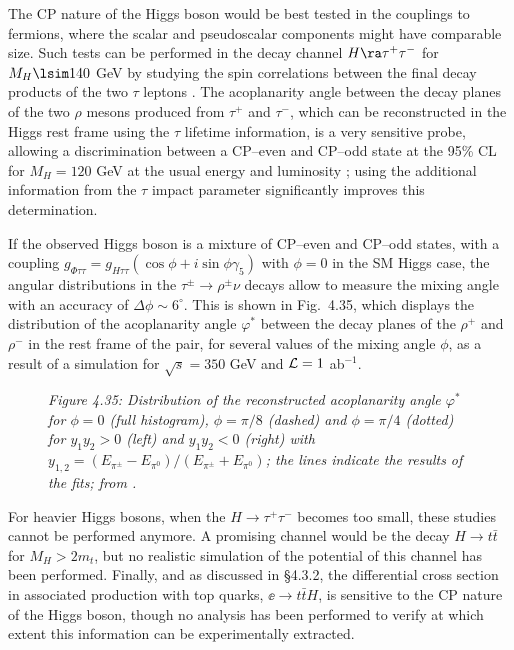 The CP nature of the Higgs boson would be best tested in the couplings to 
fermions, where the scalar and pseudoscalar components might have comparable 
size. Such tests can be performed in the decay channel $H \ra \tau^+ \tau^-$ 
for $M_H \lsim 140$ GeV by studying the spin correlations between the final 
decay products of the two $\tau$ leptons \cite{CPHff1,CPHff2}. The 
acoplanarity angle between 
the decay planes of the two $\rho$ mesons produced from $\tau^+$ and $\tau^-$,
which can be reconstructed in the Higgs rest frame using the $\tau$ lifetime
information, is a very sensitive probe, allowing a discrimination between a 
CP--even and CP--odd state at the 95\% CL for $M_H=120$ GeV at the usual energy
and luminosity \cite{CPHff3}; using the additional information from the $\tau$ 
impact parameter significantly improves this determination. \s   

If the observed Higgs boson is a mixture of CP--even and CP--odd states, with
a coupling $g_{\Phi \tau \tau} =g_{H\tau \tau} (\cos\phi+ i\sin\phi \gamma_5)$
with $\phi=0$ in the SM Higgs case, the angular distributions in the $\tau^\pm 
\to \rho^\pm \nu$ decays allow to measure the mixing angle with an accuracy of $
\Delta \phi\sim 6^\circ$. This is shown in Fig.~4.35, which displays the 
distribution
of the acoplanarity angle $\varphi^*$ between the decay planes of the $\rho^+$
and $\rho^-$ in the rest frame of the pair, for several values of the mixing 
angle $\phi$,  as a result of a simulation for $\sqrt{s}=350$ GeV and  
${\cal L}=1$ ab$^{-1}$. \s 

\begin{figure}[!h]
\begin{center} 
{}
\end{center} 
\vspace*{-2.mm}
{\it Figure 4.35: Distribution of the reconstructed acoplanarity angle 
$\varphi^*$ for $\phi = 0$ (full histogram), $\phi = \pi/8$ (dashed) and 
$\phi = \pi/4$ (dotted) for $y_1 y_2 > 0$ (left) and $y_1 y_2 < 0$ (right) with 
$y_{1,2}=(E_{\pi^{\pm}}-E_{\pi^{0}}) / (E_{\pi^{\pm}}+E_{\pi^{0}})$; the lines 
indicate the results of the fits; from \cite{Desch}.}
\label{aco-shape-2ab-rec}
\end{figure}  

For heavier Higgs bosons, when the $H \to \tau^+ \tau^-$ becomes too small,
these studies cannot be performed anymore. A promising channel would be 
the decay $H \to t\bar{t}$ for $M_H >2m_t$, but no realistic simulation 
of the potential of this channel has been performed. 
Finally, and as discussed in \S4.3.2, the differential cross section in 
associated production with top quarks, $\ee \to t\bar t H$, is sensitive
to the CP nature of the Higgs boson, though no analysis has been performed 
to verify at which extent this information can be experimentally extracted. 

